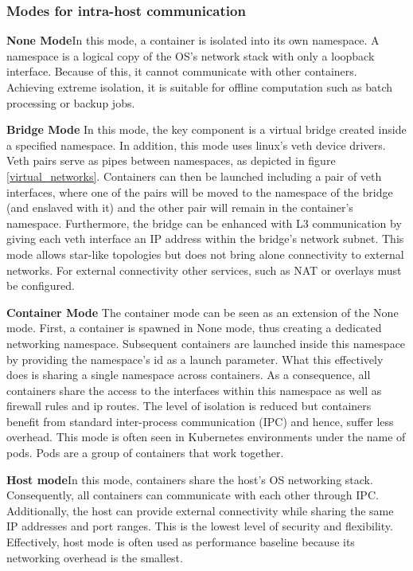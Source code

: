 \documentclass[conference]{IEEEtran}
\begin{document}
\subsubsection{Modes for intra-host communication}\hfill\break
\textbf{None Mode}\hspace{0.2cm}In this mode, a container is isolated into its own namespace. A namespace is a logical copy of the OS’s network stack with only a loopback interface. Because of this, it cannot communicate with other containers. Achieving extreme isolation, it is suitable for offline computation such as batch processing or backup jobs.

\noindent\textbf{Bridge Mode}\hspace{0.2cm} In this mode, the key component is a virtual bridge created inside a specified namespace. In addition, this mode uses linux's veth device drivers. Veth pairs serve as pipes between namespaces, as depicted in figure \ref{virtual_networks}. Containers can then be launched including a pair of veth interfaces, where one of the pairs will be moved to the namespace of the bridge (and enslaved with it) and the other pair will remain in the container's namespace. Furthermore, the bridge can be enhanced with L3 communication by giving each veth interface an IP address within the bridge's network subnet. This mode allows star-like topologies but does not bring alone connectivity to external networks. For external connectivity other services, such as NAT or overlays must be configured. 

\noindent\textbf{Container Mode}\hspace{0.2cm} The container mode can be seen as an extension of the None mode. First, a container is spawned in None mode, thus creating a dedicated networking namespace. Subsequent containers are launched inside this namespace by providing the namespace's id as a launch parameter. What this effectively does is sharing a single namespace across containers. As a consequence, all containers share the access to the interfaces within this namespace as well as firewall rules and ip routes. The level of isolation is reduced but containers benefit from standard inter-process communication (IPC) and hence, suffer less overhead. This mode is often seen in Kubernetes environments under the name of pods. Pods are a group of containers that work together.

\noindent\textbf{Host mode}\hspace{0.2cm}In this mode, containers share the host's OS networking stack. Consequently, all containers can communicate with each other through IPC. Additionally, the host can provide external connectivity while sharing the same IP addresses and port ranges. This is the lowest level of security and flexibility. Effectively, host mode is often used as performance baseline because its networking overhead is the smallest.
\end{document}
